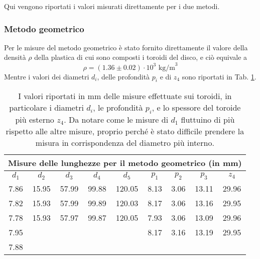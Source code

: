 Qui vengono riportati i valori misurati direttamente per i due metodi.

\subsubsection*{Metodo geometrico}
Per le misure del metodo geometrico è stato fornito direttamente il valore della densità $\rho$ della plastica di cui sono composti i toroidi del disco, e ciò equivale a
$$\rho = (1.36 \pm 0.02) \cdot 10^3 \textrm{ kg/m} ^3$$
Mentre i valori dei diametri $d_i$, delle profondità $p_i$  e di $z_4$ sono riportati in Tab. \ref{diametri_e_spessori}.\\

    \begin{table}[htp]
        \centering
        \begin{tabular}{||c|c|c|c|c||c|c|c||c||}
            \hline \hline
            \multicolumn{9}{||c||}{Misure delle lunghezze per il metodo geometrico (in mm)} \\
            \hline \hline
            $d_1$ & $d_2$ & $d_3$ & $d_4$ & $d_5$ & $p_1$ & $p_2$ & $p_3$ & $z_4$ \\
            \hline
            7.86 & 15.95 & 57.99 & 99.88 & 120.05 & 8.13 & 3.06 & 13.11 & 29.96 \\
            7.82 & 15.93 & 57.99 & 99.89 & 120.03 & 8.17 & 3.06 & 13.16 & 29.95 \\
            7.78 & 15.93 & 57.97 & 99.87 & 120.05 & 7.93 & 3.06 & 13.09 & 29.96 \\
            7.95 &       &       &       &        & 8.17 & 3.16 & 13.19 & 29.95 \\
            7.88 &       &       &       &        &      &      &       &       \\
            \hline \hline 
        \end{tabular}
        \caption[\small Misure delle lunghezze per il metodo geometrico.]{\small I valori riportati in mm delle misure effettuate sui toroidi, in particolare i diametri $d_i$, le profondità $p_i$, e lo spessore del toroide più esterno $z_4$. Da notare come le misure di $d_1$ fluttuino di più rispetto alle altre misure, proprio perché è stato difficile prendere la misura in corrispondenza del diametro più interno.}
        \label{diametri_e_spessori}
    \end{table}

